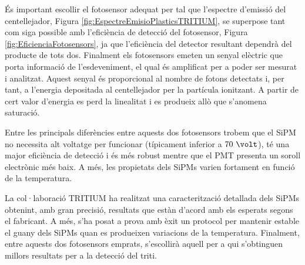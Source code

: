 És important escollir el fotosensor adequat per tal que l'espectre d'emissió del centellejador, Figura \ref{fig:EspectreEmisioPlasticsTRITIUM}, se superpose tant com siga possible amb l'eficiència de detecció del fotosensor, Figura \ref{fig:EficienciaFotosensors}, ja que l'eficiència del detector resultant dependrà del producte de tots dos. Finalment els fotosensors emeten un senyal elèctric que porta informació de l'esdeveniment, el qual és amplificat per a poder ser mesurat i analitzat. Aquest senyal és proporcional al nombre de fotons detectats i, per tant, a l'energia depositada al centellejador per la partícula ionitzant. A partir de cert valor d'energia es perd la linealitat i es produeix allò que s'anomena saturació.

Entre les principals diferències entre aquests dos fotosensors trobem que el SiPM no necessita alt voltatge per funcionar (típicament inferior a $70~\volt$), té una major eficiència de detecció i és més robust mentre que el PMT presenta un soroll electrònic més baix. A més, les propietats dels SiPMs varien fortament en funció de la temperatura.

La col·laboració TRITIUM ha realitzat una caracterització detallada dels SiPMs obtenint, amb gran precisió, resultats que estàn d'acord amb els esperats segons el fabricant. A més, s'ha posat a prova amb èxit un protocol per mantenir estable el guany dels SiPMs quan es produeixen variacions de la temperatura. Finalment, entre aquests dos fotosensors emprats, s'escollirà aquell per a qui s'obtinguen millors resultats per a la detecció del triti.